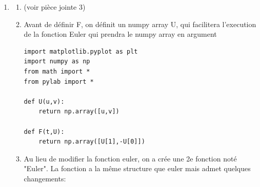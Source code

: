 \documentclass{article}
\begin{document}
\begin{enumerate}
\begin{enumerate}
\begin{lstlisting}[basicstyle=\small]
  for i in range (x0,n):
	xi = xi + h
	ui = ui + h*f(xi,ui)
	tt.append(xi)
	uu.append(ui)
 
  return tt,uu 
\end{lstlisting}
ce programme prend en paramètre une fonction puis, elle liste les n+1 premiers termes qui sont solutions de l'équation différentielle en x = k* T/n
avec k allant de 0 à n.

\end{enumerate}

\begin{enumerate}
\item
	
	\item
	
Voici le programme permettant d'écrire la fonction de l'exemple 2 puis, d'appliquer la fonction euler :
\begin{lstlisting}[basicstyle=\small]
import matplotlib.pyplot as plt
from numpy import *
from math import *
from pylab import *
from methods import euler


def u(t,u):
	return exp(-t)

X,Y = [],[]
X,Y = euler(u,1,2,10)

print X,Y

\end{lstlisting}

    \item résolution des EDO à la main en pièce jointe(1)
Nous avons essayé de résoudre la 3e EDO à la main pour être sûr qu'elle était difficilement résolvable à la main
\begin{align*} 
u'(t) &= u^2(t) - t, & u(0) &= 1.0
\end{align*}
(voir pièce jointe 2)
\end{enumerate}
\item
\begin{enumerate}
\item
(voir pièce jointe 3)
\item
Avant de définir F, on définit un numpy array U, qui facilitera l'execution de la fonction Euler qui prendra le numpy array en argument
\begin{lstlisting}[basicstyle=\small]
import matplotlib.pyplot as plt
import numpy as np
from math import *
from pylab import *

def U(u,v):
	return np.array([u,v])

def F(t,U):
	return np.array([U[1],-U[0]])

\end{lstlisting}
\item
Au lieu de modifier la fonction euler, on a crée une 2e fonction noté "Euler". La fonction a la même structure que euler mais admet quelques changements:
\begin{lstlisting}[basicstyle=\small]


\end{lstlisting}
\end{enumerate}
\end{enumerate}
\end{document}
